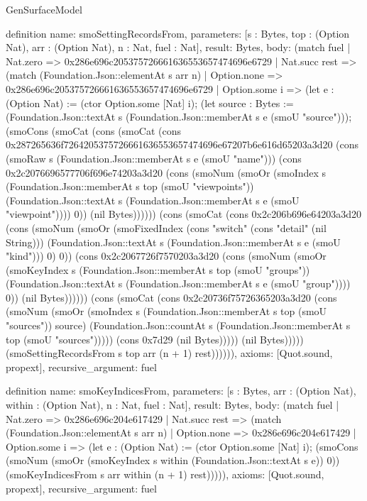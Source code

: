 \begin{lexlean}{GenSurfaceModel}
\begin{semanticmodule}
definition{
  name: smoSettingRecordsFrom,
  parameters: [s : Bytes, top : (Option Nat), arr : (Option Nat), n : Nat, fuel : Nat],
  result: Bytes,
  body: (match fuel
    | Nat.zero => 0x286e696c205375726661636553657474696e6729
    | Nat.succ rest => (match (Foundation.Json::elementAt s arr n)
      | Option.none => 0x286e696c205375726661636553657474696e6729
      | Option.some i => (let e : (Option Nat) := (ctor Option.some [Nat] i); (let source : Bytes := (Foundation.Json::textAt s (Foundation.Json::memberAt s e (smoU "source"))); (smoCons (smoCat (cons (smoCat (cons 0x287265636f7264205375726661636553657474696e67207b6e616d65203a3d20 (cons (smoRaw s (Foundation.Json::memberAt s e (smoU "name"))) (cons 0x2c2076696577706f696e74203a3d20 (cons (smoNum (smoOr (smoIndex s (Foundation.Json::memberAt s top (smoU "viewpoints")) (Foundation.Json::textAt s (Foundation.Json::memberAt s e (smoU "viewpoint")))) 0)) (nil Bytes)))))) (cons (smoCat (cons 0x2c206b696e64203a3d20 (cons (smoNum (smoOr (smoFixedIndex (cons "switch" (cons "detail" (nil String))) (Foundation.Json::textAt s (Foundation.Json::memberAt s e (smoU "kind"))) 0) 0)) (cons 0x2c2067726f7570203a3d20 (cons (smoNum (smoOr (smoKeyIndex s (Foundation.Json::memberAt s top (smoU "groups")) (Foundation.Json::textAt s (Foundation.Json::memberAt s e (smoU "group")))) 0)) (nil Bytes)))))) (cons (smoCat (cons 0x2c20736f75726365203a3d20 (cons (smoNum (smoOr (smoIndex s (Foundation.Json::memberAt s top (smoU "sources")) source) (Foundation.Json::countAt s (Foundation.Json::memberAt s top (smoU "sources"))))) (cons 0x7d29 (nil Bytes))))) (nil Bytes))))) (smoSettingRecordsFrom s top arr (n + 1) rest)))))),
  axioms: [Quot.sound, propext],
  recursive_argument: fuel
}

definition{
  name: smoKeyIndicesFrom,
  parameters: [s : Bytes, arr : (Option Nat), within : (Option Nat), n : Nat, fuel : Nat],
  result: Bytes,
  body: (match fuel
    | Nat.zero => 0x286e696c204e617429
    | Nat.succ rest => (match (Foundation.Json::elementAt s arr n)
      | Option.none => 0x286e696c204e617429
      | Option.some i => (let e : (Option Nat) := (ctor Option.some [Nat] i); (smoCons (smoNum (smoOr (smoKeyIndex s within (Foundation.Json::textAt s e)) 0)) (smoKeyIndicesFrom s arr within (n + 1) rest))))),
  axioms: [Quot.sound, propext],
  recursive_argument: fuel
}


\end{semanticmodule}
\end{lexlean}
